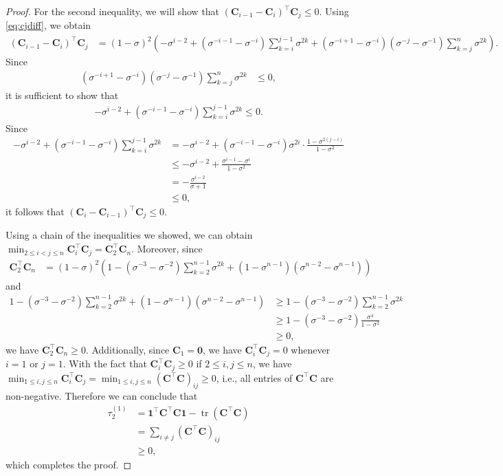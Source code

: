 \documentclass[10pt,a4paper]{amsart}
\DeclareMathOperator{\tr}{tr}
\def\bigopen#1{\left(#1\right)}
\def\mC{{\bm{C}}}
\def\vone{{\bm{1}}}
\def\vzero{{\bm{0}}}
\begin{document}
\begin{proof}
    For the second inequality, we will show that $(\mC_{i-1}-\mC_i)^{\top} \mC_j \le 0$. Using \cref{eq:cjdiff}, we obtain
    \begin{align*}
        (\mC_{i-1}-\mC_i)^{\top} \mC_j &= (1-\sigma)^2 \bigopen{-\sigma^{i-2} + (\sigma^{-i-1}-\sigma^{-i})\sum_{k=i}^{j-1} \sigma^{2k} + (\sigma^{-i+1}-\sigma^{-i})(\sigma^{-j}-\sigma^{-1})\sum_{k=j}^n \sigma^{2k}}.
    \end{align*}
    Since 
    \begin{align*}
         (\sigma^{-i+1}-\sigma^{-i})(\sigma^{-j}-\sigma^{-1})\sum_{k=j}^n \sigma^{2k} &\le 0,
    \end{align*}
    it is sufficient to show that 
    \begin{align*}
        -\sigma^{i-2} + (\sigma^{-i-1}-\sigma^{-i})\sum_{k=i}^{j-1} \sigma^{2k} \le 0.
    \end{align*}
    Since
    \begin{align*}
        -\sigma^{i-2} + (\sigma^{-i-1}-\sigma^{-i})\sum_{k=i}^{j-1} \sigma^{2k} &= -\sigma^{i-2} + (\sigma^{-i-1}-\sigma^{-i}) \sigma^{2i} \cdot \frac{1-\sigma^{2(j-i)}}{1-\sigma^2} \\
        &\le -\sigma^{i-2} + \frac{\sigma^{i-1}-\sigma^i}{1-\sigma^2}\\
        &= -\frac{\sigma^{i-2}}{\sigma+1} \\
        &\le 0,
    \end{align*}
    it follows that $(\mC_i-\mC_{i-1})^{\top} \mC_j \le 0$.

    Using a chain of the inequalities we showed, we can obtain $\min_{2\le i<j\le n} \mC_i^{\top} \mC_j = \mC_2^{\top} \mC_n$.
    Moreover, since 
    \begin{align*}
        \mC_2^{\top} \mC_n &= (1-\sigma)^2 \bigopen{1 - (\sigma^{-3}-\sigma^{-2})\sum_{k=2}^{n-1}\sigma^{2k} + (1-\sigma^{n-1})(\sigma^{n-2}-\sigma^{n-1})}
    \end{align*}
    and 
    \begin{align*}
        1 - (\sigma^{-3}-\sigma^{-2})\sum_{k=2}^{n-1}\sigma^{2k} + (1-\sigma^{n-1})(\sigma^{n-2}-\sigma^{n-1}) &\ge 1 - (\sigma^{-3}-\sigma^{-2})\sum_{k=2}^{n-1}\sigma^{2k}\\
        &\ge 1 - (\sigma^{-3}-\sigma^{-2})\frac{\sigma^4}{1-\sigma^2}\\
        &\ge 0,
    \end{align*}
    we have $\mC_2^{\top} \mC_n \ge 0$. Additionally, since $\mC_1 = \vzero$, we have $\mC_i^{\top} \mC_j = 0$ whenever $i = 1$ or $j = 1$.
    With the fact that $\mC_i^{\top} \mC_j \ge 0$ if $2 \le i, j \le n$, we have $\min_{1\le i,j \le n} \mC_i^{\top} \mC_j = \min_{1\le i,j \le n} (\mC^{\top} \mC)_{ij} \ge 0$, i.e., all entries of $\mC^{\top} \mC$ are non-negative.
    Therefore we can conclude that
    \begin{align*}
        \tau_2^{(1)} &= \vone^{\top} \mC^{\top} \mC \vone - \tr (\mC^{\top} \mC)\\
        &= \sum_{i\ne j} (\mC^{\top} \mC)_{ij}\\
        &\ge 0,
    \end{align*}
    which completes the proof.
\end{proof}
\end{document}
